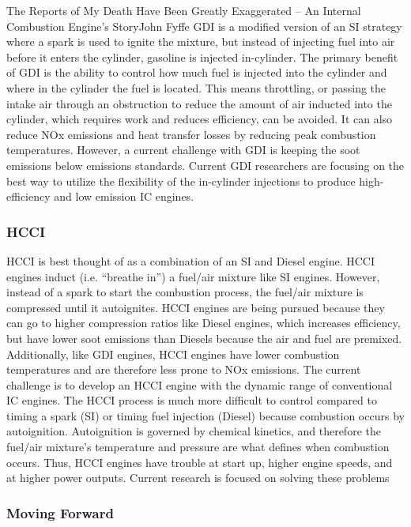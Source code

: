 \documentclass[10pt]{papertex}
\begin{document}
\begin{news}{2}{The Reports of My Death Have Been Greatly Exaggerated -- An Internal Combustion Engine’s Story}{John Fyffe}{}{}
GDI is a modified version of an SI strategy where a spark is used to ignite 
the mixture, but instead of injecting fuel into air before it enters the 
cylinder, gasoline is injected in-cylinder.  The primary benefit of GDI is 
the ability to control how much fuel is injected into the cylinder and where 
in the cylinder the fuel is located.  This means throttling, or passing the 
intake air through an obstruction to reduce the amount of air inducted into 
the cylinder, which requires work and reduces efficiency, can be avoided. 
It can also reduce NOx emissions and heat transfer losses by reducing peak 
combustion temperatures.  However, a current challenge with GDI is keeping 
the soot emissions below emissions standards.   Current GDI researchers are 
focusing on the best way to utilize the flexibility of the in-cylinder 
injections to produce high-efficiency and low emission IC engines.

\subsubsection*{HCCI}

HCCI is best thought of as a combination of an SI and Diesel engine.  HCCI 
engines induct (i.e. “breathe in”) a fuel/air mixture like SI engines.  
However, instead of a spark to start the combustion process, the fuel/air 
mixture is compressed until it autoignites.  HCCI engines are being pursued 
because they can go to higher compression ratios like Diesel engines, which 
increases efficiency, but have lower soot emissions than Diesels because 
the air and fuel are premixed.  Additionally, like GDI engines, HCCI engines 
have lower combustion temperatures and are therefore less prone to NOx 
emissions.  The current challenge is to develop an HCCI engine with the 
dynamic range of conventional IC engines.  The HCCI process is much more 
difficult to control compared to timing a spark (SI) or timing fuel injection 
(Diesel) because combustion occurs by autoignition.  Autoignition is governed 
by chemical kinetics, and therefore the fuel/air mixture’s temperature and 
pressure are what defines when combustion occurs.   Thus, HCCI engines have 
trouble at start up, higher engine speeds, and at higher power outputs. 
Current research is focused on solving these problems

\subsubsection*{Moving Forward}


\end{news}
\end{document}
